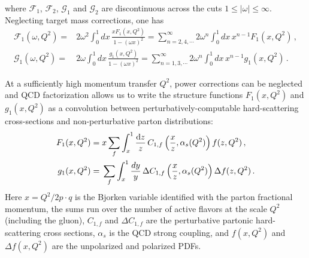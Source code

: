 where $\mathcal{F}_1$, $\mathcal{F}_2$, $\mathcal{G}_1$ and $\mathcal{G}_2$
are discontinuous across the cuts $1\leq |\omega| \leq \infty$.
%
Neglecting target mass corrections, one has
\begin{align}
\mathcal{F}_1(\omega,Q^2) 
= {} & 2 \omega^2 \int_0^1 dx\,  \frac{xF_1(x,Q^2)}{1-(\omega x)^2} 
= \sum_{n=2,4,\cdots}^\infty 2\omega^n \int_0^1 dx\, x^{n-1} F_1(x,Q^2) \,, \\
\mathcal{G}_1(\omega,Q^2) 
= {} & 2 \omega \int_0^1 dx\, \frac{g_1(x,Q^2)}{1-(\omega x)^2} 
= \sum_{n=1,3,\cdots}^\infty 2\omega^n \int_0^1 dx\, x^{n-1} g_1(x,Q^2)\,.
\end{align}

At a sufficiently high momentum transfer $Q^2$, power corrections can be 
neglected and
QCD factorization allows us to write the structure functions 
$F_1(x,Q^2)$ and $g_1(x,Q^2)$ as a convolution between perturbatively-computable
hard-scattering cross-sections and non-perturbative parton distributions:
\begin{align}
F_1(x,Q^2) 
= {} 
& x\sum_f \int_x^1 \frac{{\rm d}z}{z}\,C_{1,f}\left(\frac{x}{z},\alpha_s(Q^2)\right)f(z,Q^2) \,, \label{eq:Fi}\\
g_1(x,Q^2) 
= {} 
& \sum_f \int_x^1\frac{dy}{y}\, \Delta C_{1,f}\left(\frac{x}{z},\alpha_s(Q^2)\right) \Delta f(z,Q^2) \,.
\label{pdf}
\end{align}
%
Here $x=Q^2/2p\cdot q$ is the Bjorken variable identified with the parton
fractional momentum, the sums run over the number of active
flavors at the scale $Q^2$ (including the gluon), $C_{1,f}$ and 
$\Delta C_{1,f}$ are the perturbative partonic hard-scattering cross sections,
$\alpha_s$ is the QCD strong coupling, and $f(x,Q^2)$ and $\Delta f(x,Q^2)$ 
are the unpolarized and polarized PDFs.

